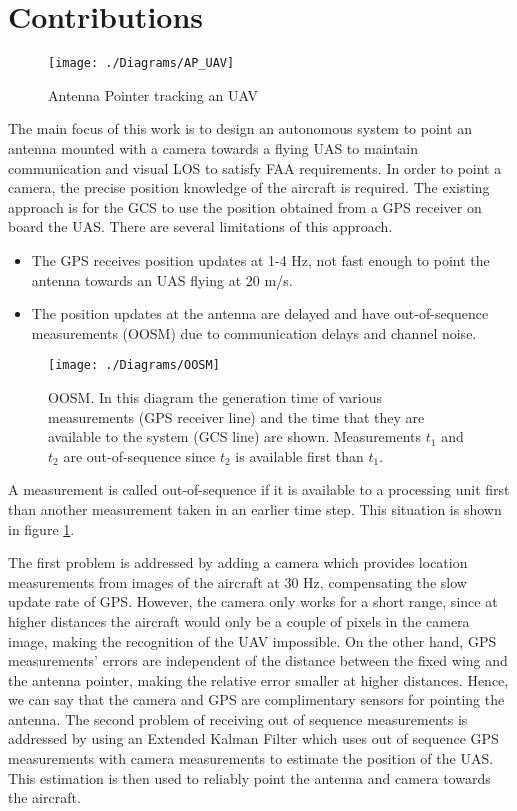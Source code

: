 \section{Contributions}
\begin{figure}[h!]
  \centering
  \texttt{[image: ./Diagrams/AP\_UAV]}
  \caption{Antenna Pointer tracking an UAV}
\end{figure}
The main focus of this work is to design an autonomous system to point an antenna mounted with a camera towards a flying UAS to maintain communication and visual LOS to satisfy FAA requirements. In order to point a camera, the precise position knowledge of the aircraft is required. The existing approach is for the GCS to use the position obtained from a GPS receiver on board the UAS. There are several limitations of this approach. 
\begin{itemize}[nosep]
\item The GPS receives position updates at 1-4 Hz, not fast enough to point the antenna towards an UAS flying at 20 m/s.
\item The position updates at the antenna are delayed and have out-of-sequence measurements (OOSM) due to communication delays and channel noise.
\end{itemize}
\begin{figure}[h!]
  \centering
  \texttt{[image: ./Diagrams/OOSM]}
  \caption[Out-Of-Sequence Measurement]{OOSM. 
  In this diagram the generation time of various measurements (GPS receiver line) and the time that they are available to the system (GCS line) are shown. Measurements $t_1$ and $t_2$ are out-of-sequence since $t_2$ is available first than $t_1$.\label{fig:OOSM}}
\end{figure}
A measurement is called out-of-sequence if it is available to a processing unit first than another measurement taken in an earlier time step. This situation is shown in figure \ref{fig:OOSM}.

The first problem is addressed by adding a camera which provides location measurements from images of the aircraft at 30 Hz, compensating the slow update rate of GPS. However, the camera only works for a short range, since at higher distances the aircraft would only be a couple of pixels in the camera image, making the recognition of the UAV impossible. On the other hand, GPS measurements' errors are independent of the distance between the fixed wing and the antenna pointer, making the relative error smaller at higher distances. Hence, we can say that the camera and GPS are complimentary sensors for pointing the antenna. The second problem of receiving out of sequence measurements is addressed by using an Extended Kalman Filter which uses out of sequence GPS measurements with camera measurements to estimate the position of the UAS. This estimation is then used to reliably point the antenna and camera towards the aircraft.

